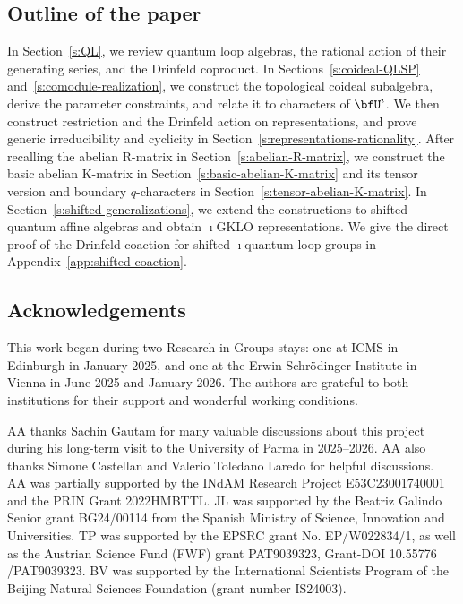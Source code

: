 \documentclass[reqno]{amsart}
\numberwithin{equation}{section}
\begin{document}
\subsection{Outline of the paper}
In Section~\ref{s:QL}, we review quantum loop algebras, the rational action of their 
generating series, and the Drinfeld coproduct.
In Sections~\ref{s:coideal-QLSP} and~\ref{s:comodule-realization}, we construct the 
topological coideal subalgebra, derive the parameter constraints, and relate it to 
characters of $\bfU^\imath$.
We then construct restriction and the Drinfeld action on representations, and prove 
generic irreducibility and cyclicity in Section~\ref{s:representations-rationality}.
After recalling the abelian R-matrix in Section~\ref{s:abelian-R-matrix}, we construct the 
basic abelian K-matrix in Section~\ref{s:basic-abelian-K-matrix} and its tensor version 
and boundary $q$-characters in Section~\ref{s:tensor-abelian-K-matrix}.
In Section~\ref{s:shifted-generalizations}, we extend the constructions to shifted 
quantum affine algebras and obtain $\imath$GKLO representations.
We give the direct proof of the Drinfeld coaction for shifted $\imath$quantum loop groups in Appendix~\ref{app:shifted-coaction}.


\subsection*{Acknowledgements}
This work began during two Research in Groups stays: one at ICMS in Edinburgh in January 2025, and one at the Erwin Schr\"{o}dinger Institute in Vienna in June 2025 and January 2026. The authors are grateful to both institutions for their support and wonderful working conditions.

AA thanks Sachin Gautam for many valuable discussions about this project during his long-term visit to the University of Parma in 2025–2026. AA also thanks Simone Castellan and Valerio Toledano Laredo for helpful discussions.
\\

AA was partially supported by the INdAM Research Project E53C23001740001 and the PRIN Grant 2022HMBTTL.
JL was supported by the Beatriz Galindo Senior grant BG24/00114 from the Spanish Ministry of Science, Innovation and Universities. 
TP was supported by the EPSRC grant No. EP/W022834/1, as well as the Austrian Science Fund (FWF)  grant PAT9039323, Grant-DOI 10.55776 /PAT9039323.
BV was supported by the International Scientists Program of the Beijing Natural Sciences Foundation (grant number IS24003).\\
\end{document}
